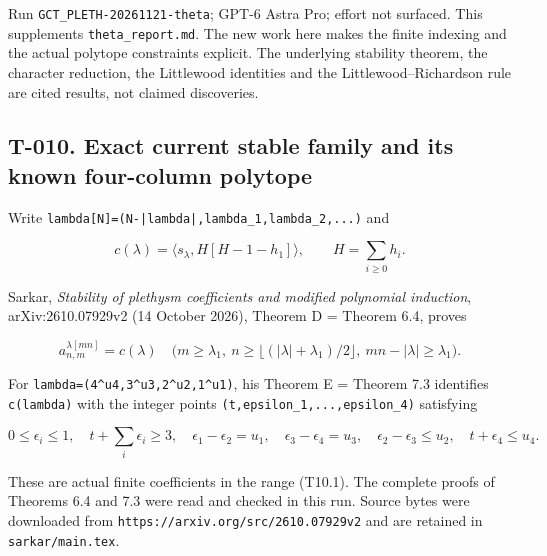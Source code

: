 \documentclass[
  10pt,
]{article}
\begin{document}
Run
\texttt{\small GCT\_\allowbreak{}PLETH-\allowbreak{}20261121-\allowbreak{}theta};
GPT-6 Astra Pro; effort not surfaced. This supplements
\texttt{\small theta\_\allowbreak{}report.md}. The new work here makes
the finite indexing and the actual polytope constraints explicit. The
underlying stability theorem, the character reduction, the Littlewood
identities and the Littlewood--Richardson rule are cited results, not
claimed discoveries.

\subsection{T-010. Exact current stable family and its known four-column
polytope}\label{t-010.-exact-current-stable-family-and-its-known-four-column-polytope}

Write
\texttt{\small lambda[\allowbreak{}N]\allowbreak{}=\allowbreak{}(\allowbreak{}N-\allowbreak{}|lambda|,\allowbreak{}lambda\_\allowbreak{}1,\allowbreak{}lambda\_\allowbreak{}2,\allowbreak{}...)\allowbreak{}}
and

\[
c(\lambda)=\langle s_\lambda,H[H-1-h_1]\rangle,
\qquad H=\sum_{i\ge0}h_i.
\]

Sarkar, \emph{Stability of plethysm coefficients and modified polynomial
induction}, arXiv:2610.07929v2 (14 October 2026), Theorem D = Theorem
6.4, proves

\[
a_{n,m}^{\lambda[mn]}=c(\lambda)
\quad\bigl(m\ge\lambda_1,\ n\ge\lfloor(|\lambda|+\lambda_1)/2\rfloor,
\ mn-|\lambda|\ge\lambda_1\bigr).
\tag{T10.1}
\]

For
\texttt{\small lambda=\allowbreak{}(\allowbreak{}4\textasciicircum{}u4,\allowbreak{}3\textasciicircum{}u3,\allowbreak{}2\textasciicircum{}u2,\allowbreak{}1\textasciicircum{}u1)\allowbreak{}},
his Theorem E = Theorem 7.3 identifies
\texttt{\small c(\allowbreak{}lambda)\allowbreak{}} with the integer
points
\texttt{\small (\allowbreak{}t,\allowbreak{}epsilon\_\allowbreak{}1,\allowbreak{}...,\allowbreak{}epsilon\_\allowbreak{}4)\allowbreak{}}
satisfying

\[
0\le\epsilon_i\le1,\quad t+\sum_i\epsilon_i\ge3,\quad
\epsilon_1-\epsilon_2=u_1,\quad \epsilon_3-\epsilon_4=u_3,
\quad\epsilon_2-\epsilon_3\le u_2,\quad t+\epsilon_4\le u_4.
\tag{T10.2}
\]

These are actual finite coefficients in the range (T10.1). The complete
proofs of Theorems 6.4 and 7.3 were read and checked in this run. Source
bytes were downloaded from
\texttt{\small https:\allowbreak{}/\allowbreak{}/\allowbreak{}arxiv.org/\allowbreak{}src/\allowbreak{}2610.07929v2}
and are retained in \texttt{\small sarkar/\allowbreak{}main.tex}.
\end{document}
